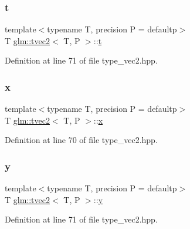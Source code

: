 \mbox{\label{structglm_1_1tvec2_aa9f424d56c1c792efbd3ad3c7d1bfb9d}} 
\subsubsection{\texorpdfstring{t}{t}}
{\footnotesize\ttfamily template$<$typename T, precision P = defaultp$>$ \\
T \mbox{\hyperlink{structglm_1_1tvec2}{glm\+::tvec2}}$<$ T, P $>$\+::\mbox{\hyperlink{glad_8h_aef9f00bf06d58b8db7e501e287488401}{t}}}



Definition at line 71 of file type\+\_\+vec2.\+hpp.

\mbox{\label{structglm_1_1tvec2_a129beaa64d75bb5414e164abd743ffc1}} 
\subsubsection{\texorpdfstring{x}{x}}
{\footnotesize\ttfamily template$<$typename T, precision P = defaultp$>$ \\
T \mbox{\hyperlink{structglm_1_1tvec2}{glm\+::tvec2}}$<$ T, P $>$\+::\mbox{\hyperlink{glad_8h_a92d0386e5c19fb81ea88c9f99644ab1d}{x}}}



Definition at line 70 of file type\+\_\+vec2.\+hpp.

\mbox{\label{structglm_1_1tvec2_a880f479f7348ba7fca07365711484d00}} 
\subsubsection{\texorpdfstring{y}{y}}
{\footnotesize\ttfamily template$<$typename T, precision P = defaultp$>$ \\
T \mbox{\hyperlink{structglm_1_1tvec2}{glm\+::tvec2}}$<$ T, P $>$\+::\mbox{\hyperlink{glad_8h_a66ddd433d2cacfe27f5906b7e86faeed}{y}}}



Definition at line 71 of file type\+\_\+vec2.\+hpp.



